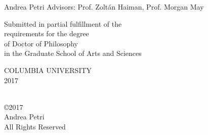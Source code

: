 \thispagestyle{empty}

\pagestyle{empty}

\begin{center}

{\Large \bf \thesistitle}

\vskip1.5in

{\Large  Andrea Petri } %
\vskip0.5in
{\Large  Advisors: Prof. Zolt\'{a}n Haiman, Prof. Morgan May} 



\vskip1.1in

\begin{singlespace}
\large
Submitted in partial fulfillment of the               \\
requirements for the degree                           \\
of Doctor of Philosophy                               \\
in the Graduate School of Arts and Sciences           \\
\end{singlespace}

\vskip0.5in

COLUMBIA UNIVERSITY                                   \\
2017                                                  \\

\end{center}


\clearpage

\begin{singlespace}
\begin{center}
\ \\
\vskip5.5in
\copyright 2017 \\ %
Andrea Petri\\
All Rights Reserved
\end{center}
\end{singlespace}

\clearpage